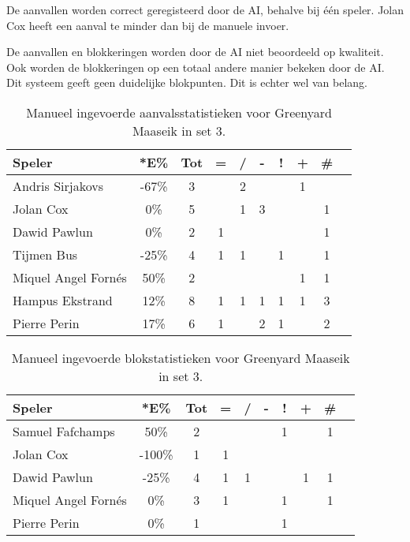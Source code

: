 De aanvallen worden correct geregisteerd door de AI, behalve bij één speler. Jolan Cox heeft een aanval te minder dan bij de manuele invoer. 

De aanvallen en blokkeringen worden door de AI niet beoordeeld op kwaliteit. Ook worden de blokkeringen op een totaal andere manier bekeken door de AI. Dit systeem geeft geen duidelijke blokpunten. Dit is echter wel van belang.

\begin{table}[ht!]
    \centering
    \scriptsize
    \begin{tabular}{|l|c|c|c|c|c|c|c|c|c|} \hline
        \textbf{Speler} & *E\% & Tot & = & / & - & ! & + & \#\\ \hline
        Andris Sirjakovs & -67\% & 3 &  & 2 &  &  & 1 &  \\ 
        Jolan Cox & 0\% & 5 &  & 1 & 3 &  &  & 1 \\ 
        Dawid Pawlun & 0\% & 2 & 1 &  &  &  &  & 1 \\ 
        Tijmen Bus & -25\% & 4 & 1 & 1 &  & 1 &  & 1 \\ 
        Miquel Angel Fornés & 50\% & 2 &  &  &  &  & 1 & 1 \\ 
        Hampus Ekstrand & 12\% & 8 & 1 & 1 & 1 & 1 & 1 & 3 \\ 
        Pierre Perin  & 17\% & 6 & 1 &  & 2 & 1 &  & 2 \\ \hline
    \end{tabular}
   \caption[Manueel ingevoerde aanvalsstatistieken voor Greenyard Maaseik in set 3]{\label{tab:PL1AttMaaseikMan3}Manueel ingevoerde aanvalsstatistieken voor Greenyard Maaseik in set 3.}
\end{table}

\begin{table}[ht!]
    \centering
    \scriptsize
    \begin{tabular}{|l|c|c|c|c|c|c|c|c|c|} \hline
        \textbf{Speler} & *E\% & Tot & = & / & - & ! & + & \#\\ \hline
        Samuel Fafchamps & 50\% & 2 &  &  &  & 1 &  & 1 \\ 
        Jolan Cox & -100\% & 1 & 1 &  &  &  &  &  \\
        Dawid Pawlun & -25\% & 4 & 1 & 1 &  &  & 1 & 1 \\
        Miquel Angel Fornés & 0\% & 3 & 1 &  &  & 1 &  & 1 \\ 
        Pierre Perin & 0\% & 1 &  &  &  & 1 &  &  \\ \hline
    \end{tabular}
    \caption[Manueel ingevoerde blokstatistieken voor Greenyard Maaseik in set 3]{\label{tab:PL1BlockMaaseikMan3}Manueel ingevoerde blokstatistieken voor Greenyard Maaseik in set 3.}
\end{table}

